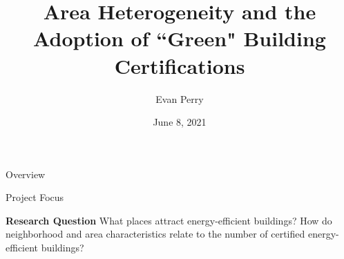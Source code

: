 \documentclass[11pt]{beamer}
\title{Area Heterogeneity and the Adoption of ``Green" Building Certifications}
\author{Evan Perry}
\institute{Spellman Program}
\date{June 8, 2021}
\begin{document}
\maketitlepage


\begin{frame}{Overview}
\tableofcontents[hideallsubsections]
\end{frame}




\begin{frame}{Project Focus}
\large
\begin{exampleblock}{\large\textbf{Research Question}}
What places attract energy-efficient buildings? How do neighborhood and area characteristics relate to the number of certified energy-efficient buildings?
\end{exampleblock}
\end{frame}




%
%
\end{document}
